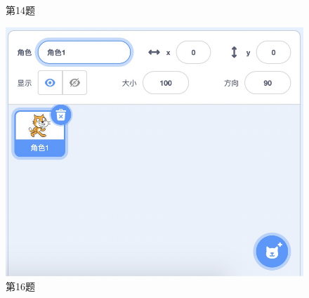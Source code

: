 \documentclass[10pt, a4paper]{article}
\begin{document}
\begin{enumerate}
\begin{figure}[htbp]
\begin{minipage}[t]{.35\textwidth}
\begin{minipage}[t]{.25\textwidth}
                \end{minipage}
                \caption*{第14题}
            \end{minipage}
            \begin{minipage}[t]{.25\textwidth}
                \centering
                \includegraphics[width=\textwidth]{16.jpg}
                \caption*{第16题}
            \end{minipage}
            \begin{minipage}[t]{.11\textwidth}
                \centering

\end{minipage}
\end{figure}
\end{enumerate}
\end{document}
